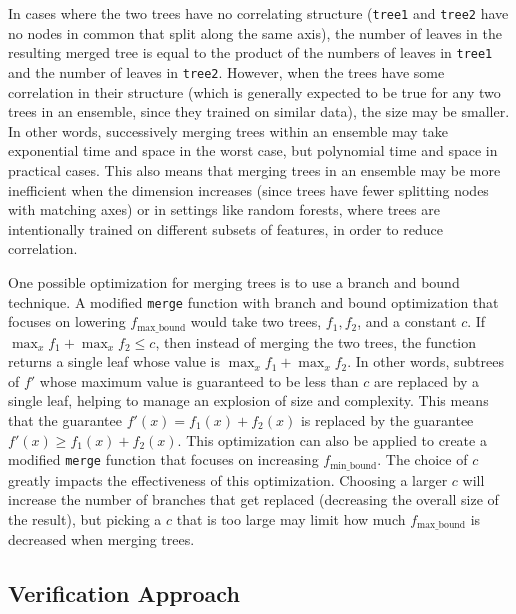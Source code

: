 \documentclass[pageno]{jpaper}
\newcommand{\fminb}{f_{\textrm{min\_bound}}}
\newcommand{\fmaxb}{f_{\textrm{max\_bound}}}
\begin{document}
\begin{doublespacing}
In cases where the two trees have no correlating structure (\verb|tree1| and \verb|tree2| have no nodes in common that split along the same axis), the number of leaves in the resulting merged tree is equal to the product of the numbers of leaves in \verb|tree1| and the number of leaves in \verb|tree2|. However, when the trees have some correlation in their structure (which is generally expected to be true for any two trees in an ensemble, since they trained on similar data), the size may be smaller. In other words, successively merging trees within an ensemble may take exponential time and space in the worst case, but polynomial time and space in practical cases. This also means that merging trees in an ensemble may be more inefficient when the dimension increases (since trees have fewer splitting nodes with matching axes) or in settings like random forests, where trees are intentionally trained on different subsets of features, in order to reduce correlation.

One possible optimization for merging trees is to use a branch and bound technique. A modified \verb|merge| function with branch and bound optimization that focuses on lowering $\fmaxb$ would take two trees, $f_1, f_2$, and a constant $c$. If $\max_x f_1 + \max_x f_2 \le c$, then instead of merging the two trees, the function returns a single leaf whose value is $\max_x f_1 + \max_x f_2$. In other words, subtrees of $f'$ whose maximum value is guaranteed to be less than $c$ are replaced by a single leaf, helping to manage an explosion of size and complexity. This means that the guarantee $f'(x) = f_1(x) + f_2(x)$ is replaced by the guarantee $f'(x) \ge f_1 (x) + f_2 (x)$. This optimization can also be applied to create a modified \verb|merge| function that focuses on increasing $\fminb$. The choice of $c$ greatly impacts the effectiveness of this optimization. Choosing a larger $c$ will increase the number of branches that get replaced (decreasing the overall size of the result), but picking a $c$ that is too large may limit how much $\fmaxb$ is decreased when merging trees.

\subsection{Verification Approach}

\end{doublespacing}
\end{document}
